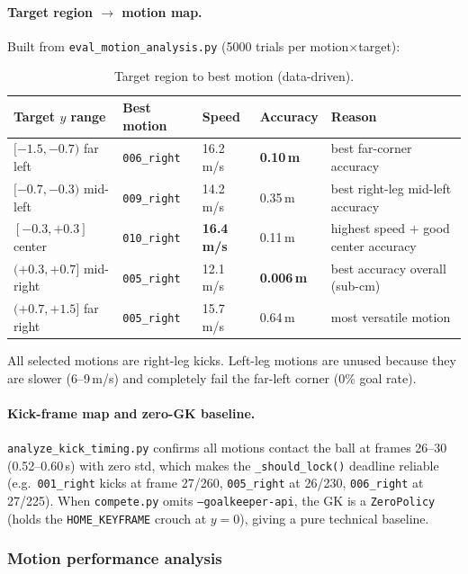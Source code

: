 \documentclass{article}
\newcommand{\code}[1]{\texttt{#1}}
\begin{document}
\paragraph{Target region $\to$ motion map.}
Built from \code{eval_motion_analysis.py} (5000 trials per motion$\times$target):

\begin{table}[h]
\centering\small
\caption{Target region to best motion (data-driven).}
\begin{tabular}{@{}lllll@{}}
\toprule
Target $y$ range & Best motion & Speed & Accuracy & Reason \\
\midrule
$[-1.5,-0.7)$ far left & \code{006_right} & 16.2\,m/s & \textbf{0.10\,m} & best far-corner accuracy \\
$[-0.7,-0.3)$ mid-left & \code{009_right} & 14.2\,m/s & 0.35\,m & best right-leg mid-left accuracy \\
$[-0.3,+0.3]$ center & \code{010_right} & \textbf{16.4\,m/s} & 0.11\,m & highest speed $+$ good center accuracy \\
$(+0.3,+0.7]$ mid-right & \code{005_right} & 12.1\,m/s & \textbf{0.006\,m} & best accuracy overall (sub-cm) \\
$(+0.7,+1.5]$ far right & \code{005_right} & 15.7\,m/s & 0.64\,m & most versatile motion \\
\bottomrule
\end{tabular}
\end{table}
All selected motions are right-leg kicks. Left-leg motions are unused because
they are slower (6--9\,m/s) and completely fail the far-left corner (0\% goal
rate).

\paragraph{Kick-frame map and zero-GK baseline.}
\code{analyze_kick_timing.py} confirms all motions contact the ball at frames
26--30 (0.52--0.60\,s) with zero std, which makes the \code{_should_lock()}
deadline reliable (e.g.\ \code{001_right} kicks at frame 27/260,
\code{005_right} at 26/230, \code{006_right} at 27/225). When \code{compete.py}
omits \code{--goalkeeper-api}, the GK is a \code{ZeroPolicy} (holds the
\code{HOME_KEYFRAME} crouch at $y=0$), giving a pure technical baseline.

\subsubsection{Motion performance analysis}\label{sec:sh-motion}
\end{document}
